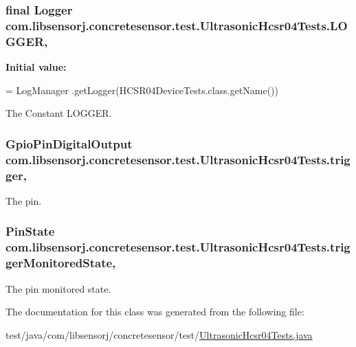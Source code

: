 \subsubsection[{L\+O\+G\+G\+E\+R}]{\setlength{\rightskip}{0pt plus 5cm}final Logger com.\+libsensorj.\+concretesensor.\+test.\+Ultrasonic\+Hcsr04\+Tests.\+L\+O\+G\+G\+E\+R\hspace{0.3cm}{\ttfamily [static]}, {\ttfamily [private]}}\label{classcom_1_1libsensorj_1_1concretesensor_1_1test_1_1UltrasonicHcsr04Tests_a2ecfecf256b928e26574e87880593489}
{\bfseries Initial value\+:}
\begin{DoxyCode}
= LogManager
            .getLogger(HCSR04DeviceTests.class.getName())
\end{DoxyCode}
The Constant L\+O\+G\+G\+E\+R. \hypertarget{classcom_1_1libsensorj_1_1concretesensor_1_1test_1_1UltrasonicHcsr04Tests_a55b09e3407d26ec3c58fa21959f48c37}{}
\subsubsection[{trigger}]{\setlength{\rightskip}{0pt plus 5cm}Gpio\+Pin\+Digital\+Output com.\+libsensorj.\+concretesensor.\+test.\+Ultrasonic\+Hcsr04\+Tests.\+trigger\hspace{0.3cm}{\ttfamily [static]}, {\ttfamily [private]}}\label{classcom_1_1libsensorj_1_1concretesensor_1_1test_1_1UltrasonicHcsr04Tests_a55b09e3407d26ec3c58fa21959f48c37}
The pin. \hypertarget{classcom_1_1libsensorj_1_1concretesensor_1_1test_1_1UltrasonicHcsr04Tests_a51543cdaf2606945a604c3f67aeac74c}{}
\subsubsection[{trigger\+Monitored\+State}]{\setlength{\rightskip}{0pt plus 5cm}Pin\+State com.\+libsensorj.\+concretesensor.\+test.\+Ultrasonic\+Hcsr04\+Tests.\+trigger\+Monitored\+State\hspace{0.3cm}{\ttfamily [static]}, {\ttfamily [private]}}\label{classcom_1_1libsensorj_1_1concretesensor_1_1test_1_1UltrasonicHcsr04Tests_a51543cdaf2606945a604c3f67aeac74c}
The pin monitored state. 

The documentation for this class was generated from the following file\+:\begin{DoxyCompactItemize}
\item 
test/java/com/libsensorj/concretesensor/test/\hyperlink{UltrasonicHcsr04Tests_8java}{Ultrasonic\+Hcsr04\+Tests.\+java}\end{DoxyCompactItemize}
